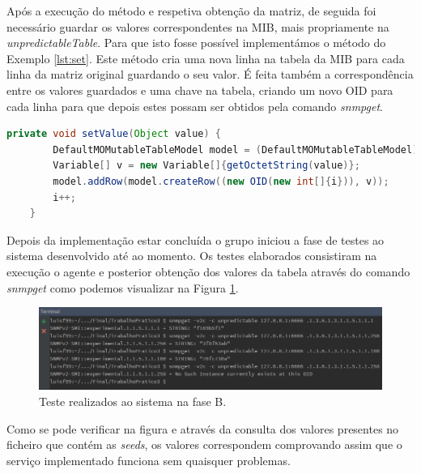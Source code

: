 \documentclass[../momento_1.tex]{subfiles}
\begin{document}
Após a execução do método e respetiva obtenção da matriz, de seguida foi necessário guardar os valores correspondentes na MIB, mais propriamente na \textit{unpredictableTable}. Para que isto fosse possível implementámos o método do Exemplo \ref{lst:set}. Este método cria uma nova linha na tabela da MIB para cada linha da matriz original guardando o seu valor. É feita também a correspondência entre os valores guardados e uma chave na tabela, criando um novo OID para cada linha para que depois estes possam ser obtidos pela comando \textit{snmpget}.\\

{
\begin{lstlisting}[caption={Método utilizado para guardar a matriz na tabela da MIB.},label={lst:set},language=JAVA]
	private void setValue(Object value) {
        DefaultMOMutableTableModel model = (DefaultMOMutableTableModel) uminhogrmib.getRandomEntry().getModel();
        Variable[] v = new Variable[]{getOctetString(value)};
        model.addRow(model.createRow((new OID(new int[]{i})), v));
        i++;
    }
\end{lstlisting}}

Depois da implementação estar concluída o grupo iniciou a fase de testes ao sistema desenvolvido até  ao momento. Os testes elaborados consistiram na execução o agente e posterior obtenção dos valores da tabela através do comando \textit{snmpget} como podemos visualizar na Figura \ref{fig:faseC}.\\ 

\begin{figure}[H]
\centering
\captionsetup{justification=centering,margin=2cm}
\centerline{\includegraphics[scale=0.4]{../imagens/faseC.png}}
\caption{Teste realizados ao sistema na fase B.}
\label{fig:faseC}
\end{figure}

Como se pode verificar na figura e através da consulta dos valores presentes no ficheiro que contém as \textit{seeds}, os valores correspondem comprovando assim que o serviço implementado funciona sem quaisquer problemas.\\[17cm]
\end{document}
